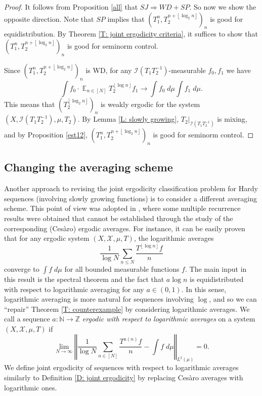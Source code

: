 \documentclass[11pt]{amsart}
\theoremstyle{definition}
\DeclareMathOperator*{\E}{\mathbb{E}}
\newcommand{\N}{{\mathbb N}}
\newcommand{\Z}{{\mathbb Z}}
\newcommand{\CI}{{\mathcal I}}
\newcommand{\CX}{{\mathcal X}}
\newcommand{\norm}[1]{\left\Vert #1\right\Vert}
\newcommand{\inv}{^{-1}}
\newcommand{\1}{{\mathbf{1}}}
\newcommand{\floor}[1]{{\left \lfloor #1 \right \rfloor}}
\begin{document}

\begin{proof}
    It follows from Proposition \ref{all} that $SJ\Rightarrow WD+SP$. So now we show the opposite direction. Note that $SP$ implies that $(T_{1}^{n},T_{2}^{n+\floor{\log_{2}n}})_{n}$ is good for equidistribution. By Theorem \ref{T: joint ergodicity criteria}, it suffices to show that $(T_{1}^{n},T_{2}^{n+\floor{\log_{2}n}})_{n}$ is good for seminorm control.
    
     Since $(T_{1}^{n},T_{2}^{n+\floor{\log_{2}n}})_{n}$ is WD, for any $\CI(T_1T_2\inv)$-measurable $f_0, f_1$ we have $$\int f_0 \cdot \E_{n\in[N]} T_2^{\floor{\log n}} f_1\to\int f_0\; d\mu \int f_1\; d\mu.$$ 
This means that $(T_{2}^{\floor{\log_{2}n}})_{n}$ is weakly ergodic for the system $(X,\mathcal{I}(T_1T_2\inv),\mu,T_{2})$. By Lemma \ref{L: slowly growing}, $T_{2}\vert_{\mathcal{I}(T_1T_2\inv)}$ is mixing, and by Proposition \ref{est12}, $(T_{1}^{n},T_{2}^{n+\floor{\log_{2}n}})_{n}$ is good for seminorm control.
\end{proof}







 \subsection{Changing the averaging scheme}
Another approach to revising the joint ergodicity classification problem for Hardy sequences (involving slowly growing functions) is to consider a different averaging scheme. This point of view was adopted in \cite{BMR20}, where some multiple recurrence results were obtained that cannot be established through the study of the corresponding (Ces\`{a}ro) ergodic averages. For instance, it can be easily proven that for any ergodic system $(X,\CX,\mu, T)$, the logarithmic averages $$\frac{1}{\log N}\sum_{n\leq N} \frac{T^{\floor{\log n}}f}{n}$$ 
converge to $\int f\; d\mu$ for all bounded measurable functions $f$. The main input in this result is the spectral theorem and the fact that $a\log n$ is equidistributed with respect to logarithmic averaging for any $a\in (0,1)$. In this sense, logarithmic averaging is more natural for sequences involving $\log$, and so we can ``repair'' Theorem \ref{T: counterexample} by considering logarithmic averages. We call a sequence $a:\N\to \Z$ \emph{ergodic with respect to logarithmic averages} on a system $(X,\CX, \mu,T)$  if \begin{equation*}
    \lim_{N\to\infty} \norm{\frac{1}{\log N}\sum_{n\in [N]} \frac{T^{a(n)}f}{n}-\int f\; d\mu }_{L^2(\mu)}=0.
\end{equation*}We define joint ergodicity of sequences with respect to logarithmic averages similarly to Definition \ref{D: joint ergodicity} by replacing Ces\`{a}ro averages with logarithmic ones. 
\end{document}
